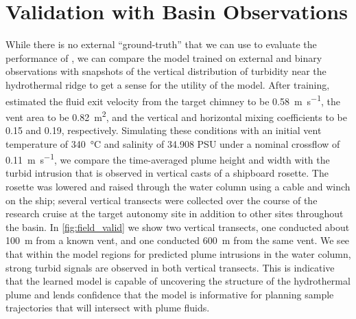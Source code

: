 \section{\PHUMES Validation with Basin Observations}
While there is no external ``ground-truth'' that we can use to evaluate the performance of \PHORTEX, we can compare the \PHUMES model trained on external and binary \Sentry observations with snapshots of the vertical distribution of turbidity near the hydrothermal ridge to get a sense for the utility of the \PHUMES model. After training, \PHUMES estimated the fluid exit velocity from the target chimney to be \SI{0.58}{\meter\per\second}, the vent area to be \SI{0.82}{\meter\squared}, and the vertical and horizontal mixing coefficients to be 0.15 and 0.19, respectively. Simulating these conditions with an initial vent temperature of \SI{340}{\celsius} and salinity of 34.908 PSU under a nominal crossflow of \SI{0.11}{\meter\per\second}, we compare the time-averaged plume height and width with the turbid intrusion that is observed in vertical casts of a shipboard rosette. The rosette was lowered and raised through the water column using a cable and winch on the ship; several vertical transects were collected over the course of the research cruise at the target autonomy site in addition to other sites throughout the basin. In \cref{fig:field_valid} we show two vertical transects, one conducted about \SI{100}{\meter} from a known vent, and one conducted \SI{600}{\meter} from the same vent. We see that within the model regions for predicted plume intrusions in the water column, strong turbid signals are observed in both vertical transects. This is indicative that the learned \PHUMES model is capable of uncovering the structure of the hydrothermal plume and lends confidence that the model is informative for planning sample trajectories that will intersect with plume fluids.

